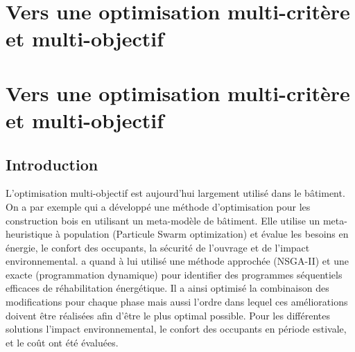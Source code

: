 



\section{Vers une optimisation multi-critère et multi-objectif} %
\label{sec:multi_critere}
\section{Vers une optimisation multi-critère et multi-objectif} %
\label{sec:vers_une_optimisation_multi_critere_et_multi_objectif}


\subsection{Introduction} %
\label{sub:introduction}

L’optimisation multi-objectif est aujourd’hui largement utilisé dans le bâtiment.
On a par exemple \cite{Armand-Decker2015} qui a développé une méthode d’optimisation pour les
construction bois en utilisant un meta-modèle de bâtiment. Elle utilise un meta-heuristique
à population (Particule Swarm optimization) et évalue les besoins en énergie, le confort des
occupants, la sécurité de l’ouvrage et de l’impact environnemental. \cite{Rivallain2013}
a quand à lui utilisé une méthode approchée (NSGA-II) et une exacte (programmation dynamique)
pour identifier des programmes séquentiels efficaces de réhabilitation énergétique.
Il a ainsi optimisé la combinaison des modifications pour chaque phase mais aussi l’ordre
dans lequel ces améliorations doivent être réalisées afin d’être le plus optimal
possible.
Pour les différentes solutions l’impact environnemental, le confort des occupants en
période estivale, et le coût ont été évaluées.

